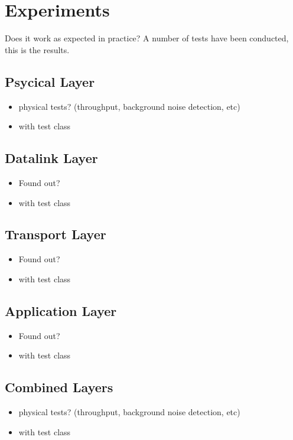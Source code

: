 \chapter{Experiments}
Does it work as expected in practice?
A number of tests have been conducted, this is the results.
\section{Psycical Layer}

\begin{itemize}
\item physical tests? (throughput, background noise detection, etc)
\item with test class
\end{itemize}

\section{Datalink Layer}

\begin{itemize}
\item Found out?
\item with test class
\end{itemize}

\section{Transport Layer}

\begin{itemize}
\item Found out?
\item with test class
\end{itemize}

\section{Application Layer}

\begin{itemize}
\item Found out?
\item with test class
\end{itemize}

\section{Combined Layers}

\begin{itemize}
\item physical tests? (throughput, background noise detection, etc)
\item with test class
\end{itemize}
